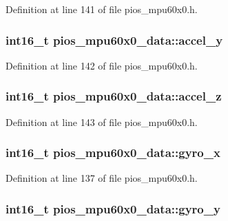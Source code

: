 \-Definition at line 141 of file pios\-\_\-mpu60x0.\-h.

\hypertarget{structpios__mpu60x0__data_a730c9c5aff6db5ecad97a13fba4da981}{
\subsubsection[{accel\-\_\-y}]{\setlength{\rightskip}{0pt plus 5cm}int16\-\_\-t {\bf pios\-\_\-mpu60x0\-\_\-data\-::accel\-\_\-y}}}\label{structpios__mpu60x0__data_a730c9c5aff6db5ecad97a13fba4da981}


\-Definition at line 142 of file pios\-\_\-mpu60x0.\-h.

\hypertarget{structpios__mpu60x0__data_a20c00b7ce03653dd56fc9bfe364eac75}{
\subsubsection[{accel\-\_\-z}]{\setlength{\rightskip}{0pt plus 5cm}int16\-\_\-t {\bf pios\-\_\-mpu60x0\-\_\-data\-::accel\-\_\-z}}}\label{structpios__mpu60x0__data_a20c00b7ce03653dd56fc9bfe364eac75}


\-Definition at line 143 of file pios\-\_\-mpu60x0.\-h.

\hypertarget{structpios__mpu60x0__data_a6369d6fde9747bdd53c2dda900377b0c}{
\subsubsection[{gyro\-\_\-x}]{\setlength{\rightskip}{0pt plus 5cm}int16\-\_\-t {\bf pios\-\_\-mpu60x0\-\_\-data\-::gyro\-\_\-x}}}\label{structpios__mpu60x0__data_a6369d6fde9747bdd53c2dda900377b0c}


\-Definition at line 137 of file pios\-\_\-mpu60x0.\-h.

\hypertarget{structpios__mpu60x0__data_afdb7be8323e08a88d0e6c4909a868ad4}{
\subsubsection[{gyro\-\_\-y}]{\setlength{\rightskip}{0pt plus 5cm}int16\-\_\-t {\bf pios\-\_\-mpu60x0\-\_\-data\-::gyro\-\_\-y}}}\label{structpios__mpu60x0__data_afdb7be8323e08a88d0e6c4909a868ad4}



